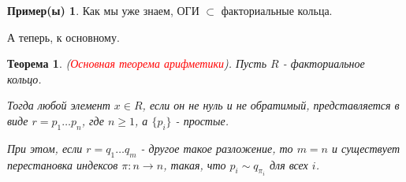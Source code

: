 \documentclass[a4paper,100pt]{article}
\theoremstyle{indented}
\newtheorem{theorem}{Теорема}
\theoremstyle{definition}
\newtheorem{exl}{Пример(ы)}
\theoremstyle{remark}
\begin{document}
\begin{exl}
    Как мы уже знаем, ОГИ $\subset$ факториальные кольца.
\end{exl}

А теперь, к основному.\\

\begin{theorem}
    (\hypertarget{n13}{\textcolor{red}{\textit{Основная теорема арифметики}}}). Пусть $R$ - факториальное кольцо.\ 

    Тогда любой элемент $x\in R$, если он не нуль и не обратимый, представляется в виде $r=p_1\dots p_n$, где $n\geq 1$, а $\{p_i\}$ - простые.\ 

    При этом, если $r=q_1\dots q_m$ - другое такое разложение, то $m=n$ и существует перестановка индексов $\pi: n\rightarrow n$, такая, что $p_i\sim q_{\pi_i}$ для всех $i$.
\end{theorem}
\end{document}
